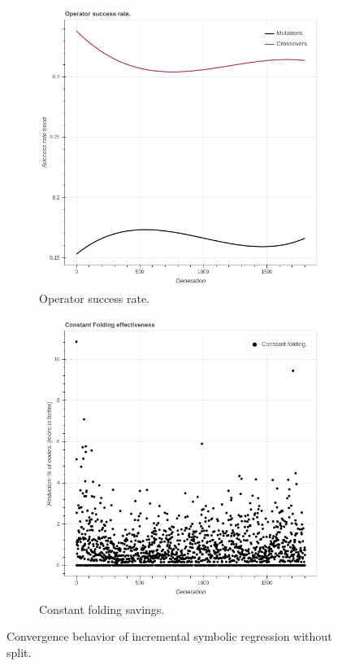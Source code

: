 \begin{figure}
\begin{subfigure}{0.5\textwidth}
        \includegraphics[width=0.8\linewidth]{figures/incrementaloperatorsuccessrate30.png}
        \caption{Operator success rate.}
    \end{subfigure}
    \begin{subfigure}{0.5\textwidth}
        \includegraphics[width=0.8\linewidth]{figures/incrementalconstfolding30.png}
        \caption{Constant folding savings.}
    \end{subfigure}
    \caption{Convergence behavior of incremental symbolic regression without split.}
    \label{fig:incrementalconvergence}
\end{figure}

